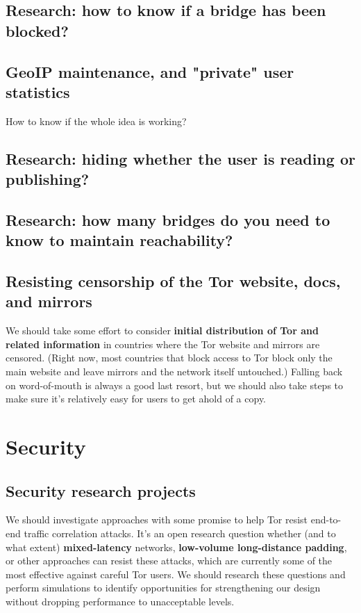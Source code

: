 \documentclass{article}
\begin{document}
\subsection{Research: how to know if a bridge has been blocked?}

\subsection{GeoIP maintenance, and "private" user statistics}
How to know if the whole idea is working?

\subsection{Research: hiding whether the user is reading or publishing?}

\subsection{Research: how many bridges do you need to know to maintain
reachability?}

\subsection{Resisting censorship of the Tor website, docs, and mirrors}

We should take some effort to consider {\bf initial distribution of Tor and
  related information} in countries where the Tor website and mirrors are
censored.  (Right now, most countries that block access to Tor block only the
main website and leave mirrors and the network itself untouched.)  Falling
back on word-of-mouth is always a good last resort, but we should also take
steps to make sure it's relatively easy for users to get ahold of a copy.

\section{Security}

\subsection{Security research projects}

We should investigate approaches with some promise to help Tor resist
end-to-end traffic correlation attacks.  It's an open research question
whether (and to what extent) {\bf mixed-latency} networks, {\bf low-volume
  long-distance padding}, or other approaches can resist these attacks, which
are currently some of the most effective against careful Tor users.  We
should research these questions and perform simulations to identify
opportunities for strengthening our design without dropping performance to
unacceptable levels. %
\end{document}
